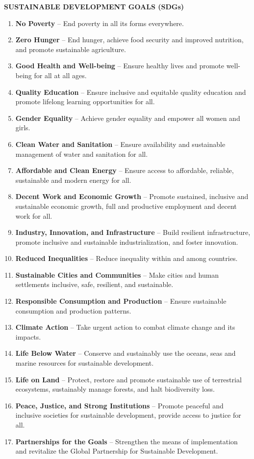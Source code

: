 \begin{center}
\textbf{\fontsize{16}{30}\selectfont SUSTAINABLE DEVELOPMENT GOALS (SDGs)}
\end{center}
\vspace{1em}

\begin{enumerate}
\item \textbf{No Poverty} -- End poverty in all its forms everywhere.
\item \textbf{Zero Hunger} -- End hunger, achieve food security and improved nutrition, and promote sustainable agriculture.
\item \textbf{Good Health and Well-being} -- Ensure healthy lives and promote well-being for all at all ages.
\item \textbf{Quality Education} -- Ensure inclusive and equitable quality education and promote lifelong learning opportunities for all.
\item \textbf{Gender Equality} -- Achieve gender equality and empower all women and girls.
\item \textbf{Clean Water and Sanitation} -- Ensure availability and sustainable management of water and sanitation for all.
\item \textbf{Affordable and Clean Energy} -- Ensure access to affordable, reliable, sustainable and modern energy for all.
\item \textbf{Decent Work and Economic Growth} -- Promote sustained, inclusive and sustainable economic growth, full and productive employment and decent work for all.
\item \textbf{Industry, Innovation, and Infrastructure} -- Build resilient infrastructure, promote inclusive and sustainable industrialization, and foster innovation.
\item \textbf{Reduced Inequalities} -- Reduce inequality within and among countries.
\item \textbf{Sustainable Cities and Communities} -- Make cities and human settlements inclusive, safe, resilient, and sustainable.
\item \textbf{Responsible Consumption and Production} -- Ensure sustainable consumption and production patterns.
\item \textbf{Climate Action} -- Take urgent action to combat climate change and its impacts.
\item \textbf{Life Below Water} -- Conserve and sustainably use the oceans, seas and marine resources for sustainable development.
\item \textbf{Life on Land} -- Protect, restore and promote sustainable use of terrestrial ecosystems, sustainably manage forests, and halt biodiversity loss.
\item \textbf{Peace, Justice, and Strong Institutions} -- Promote peaceful and inclusive societies for sustainable development, provide access to justice for all.
\item \textbf{Partnerships for the Goals} -- Strengthen the means of implementation and revitalize the Global Partnership for Sustainable Development.
\end{enumerate}
\clearpage

